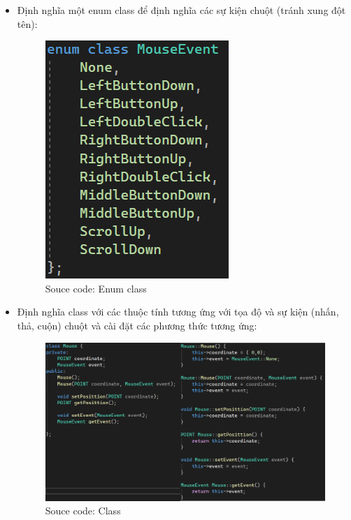 	\begin{itemize}
		\item Định nghĩa một enum  class \textbf{} để định nghĩa các sự kiện chuột (tránh xung đột tên):
			\begin{figure}[H]
			\begin{center}
				\includegraphics[scale=1]{img/enumClassMouse}
                 \caption{Souce code: Enum class \textbf{}}
			\end{center}
		\end{figure}
		\item Định nghĩa class \textbf{} với các thuộc tính \textbf{} tương ứng với tọa độ và sự kiện (nhấn, thả, cuộn) chuột và cài đặt các phương thức  \textbf{} tương ứng:
			\begin{figure}[H]
			\begin{center}
				\includegraphics[scale=0.63]{img/mouseClass}
                  \caption{Souce code: Class \textbf{}}   
			\end{center}
		\end{figure}
	

\end{itemize}
